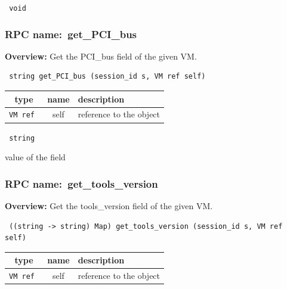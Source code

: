 \vspace{0.3cm}

{\tt 
void
}



\vspace{0.3cm}
\vspace{0.3cm}
\vspace{0.3cm}
\subsubsection{RPC name:~get\_PCI\_bus}

{\bf Overview:} 
Get the PCI\_bus field of the given VM.

\begin{verbatim} string get_PCI_bus (session_id s, VM ref self)\end{verbatim}



 
\vspace{0.3cm}
\begin{tabular}{|c|c|p{7cm}|}
 \hline
{\bf type} & {\bf name} & {\bf description} \\ \hline
{\tt VM ref } & self & reference to the object \\ \hline 

\end{tabular}

\vspace{0.3cm}

{\tt 
string
}


value of the field
\vspace{0.3cm}
\vspace{0.3cm}
\vspace{0.3cm}
\subsubsection{RPC name:~get\_tools\_version}

{\bf Overview:} 
Get the tools\_version field of the given VM.

\begin{verbatim} ((string -> string) Map) get_tools_version (session_id s, VM ref self)\end{verbatim}



 
\vspace{0.3cm}
\begin{tabular}{|c|c|p{7cm}|}
 \hline
{\bf type} & {\bf name} & {\bf description} \\ \hline
{\tt VM ref } & self & reference to the object \\ \hline 

\end{tabular}

